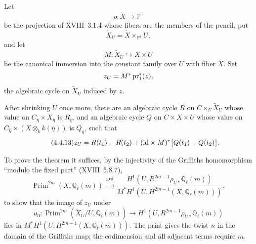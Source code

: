 Let
\begin{equation*}
\rho:\widetilde X\longrightarrow\mathbb P^1
\end{equation*}
be the projection of XVIII~3.1.4 whose fibers are the members of the
pencil, put
\begin{equation*}
\widetilde X_U=\widetilde X\times_{\mathbb P^1}U,
\end{equation*}
and let
\begin{equation*}
M:\widetilde X_U\hookrightarrow X\times U
\end{equation*}
be the canonical immersion into the constant family over $U$ with fiber
$X$.  Set
\begin{equation*}
z_U=M^*\operatorname{pr}_1^*(z),
\end{equation*}
the algebraic cycle on $\widetilde X_U$ induced by $z$.

After shrinking $U$ once more, there are an algebraic cycle $R$ on
$C\times_U\widetilde X_U$ whose value on
$C_{\bar\eta}\times X_{\bar\eta}$ is $R_{\bar\eta}$, and an algebraic
cycle $Q$ on $C\times X\times U$ whose value on
$C_{\bar\eta}\times(X\otimes_k k(\bar\eta))$ is $Q_{\bar\eta}$, such
that
\begin{equation}\tag{4.4.13}
z_U=R(t_1)-R(t_2)
+(\mathrm{id}\times M)^*\bigl[Q(t_1)-Q(t_2)\bigr].
\end{equation}

To prove the theorem it suffices, by the injectivity of the Griffiths
homomorphism ``modulo the fixed part'' (XVIII~5.8.7),
\begin{equation*}
\operatorname{Prim}^{2m}(X,\mathbb Q_\ell(m))
\xrightarrow{\ \underline{\operatorname{grif}}\ }
\frac{H^1(U,R^{2m-1}\rho_{U*}\mathbb Q_\ell(m))}
{M^*H^1(U,H^{2m-1}(X,\mathbb Q_\ell(m)))},
\end{equation*}
to show that the image of $z_U$ under
\begin{equation*}
u_0:\operatorname{Prim}^{2m}(\widetilde X_U/U,\mathbb Q_\ell(m))
\longrightarrow H^1(U,R^{2m-1}\rho_{U*}\mathbb Q_\ell(m))
\end{equation*}
lies in
$M^*H^1(U,H^{2m-1}(X,\mathbb Q_\ell(m)))$.
The print gives the twist $n$ in the domain of the Griffiths map; the
codimension and all adjacent terms require $m$.


